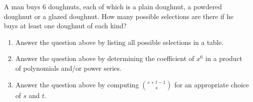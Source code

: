 \documentclass{homework}
\begin{document}
\question A man buys 6 doughnuts, each of which is a plain doughnut, a powdered doughnut or a glazed doughnut. How many possible selections are there if he buys at least one doughnut of each kind?
\begin{enumerate}[label=(\alph*)]
    \item Answer the question above by listing all possible selections in a table.
    \item Answer the question above by determining the coefficient of $x^6$ in a product of polynomials and/or power series.
    \item Answer the question above by computing $\binom{s+t-1}{s}$ for an appropriate choice of $s$ and $t$.

\pagebreak{}


\end{enumerate}
\end{document}
